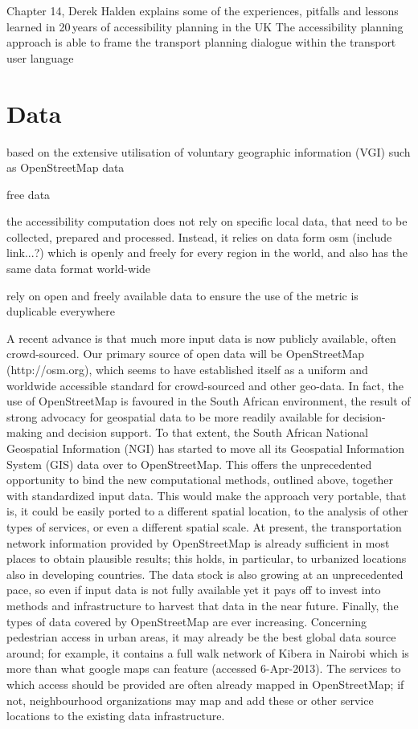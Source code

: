 Chapter 14, Derek Halden explains some of the experiences, pitfalls and lessons learned in 20\,years of accessibility 
planning in the UK The accessibility planning approach is able to frame the transport planning dialogue within 
the transport user language 


\section{Data}
based on the extensive utilisation of voluntary
geographic information (VGI) such as OpenStreetMap data

free data

the accessibility computation does not rely on specific local data, that need to be collected, prepared and processed. 
Instead, it relies on data form \gls{osm} (include link...?) which is openly and freely for every region in the world, 
and also has the same data format world-wide

rely on open and freely available data to ensure the use of the metric is duplicable everywhere

A recent advance is that much more input data is now publicly available, often crowd-sourced. Our primary source of open data will be OpenStreetMap (http://osm.org), which seems to have established itself as a uniform and worldwide accessible standard for crowd-sourced and other geo-data. In fact, the use of OpenStreetMap is favoured in the South African environment, the result of strong advocacy for geospatial data to be more readily available for decision-making and decision support. To that extent, the South African National Geospatial Information (NGI) has started to move all its Geospatial Information System (GIS) data over to OpenStreetMap.
This offers the unprecedented opportunity to bind the new computational methods, outlined above, together with standardized input data. This would make the approach very portable, that is, it could be easily ported to a different spatial location, to the analysis of other types of services, or even a different spatial scale.
At present, the transportation network information provided by OpenStreetMap is already sufficient in most places to obtain plausible results; this holds, in particular, to urbanized locations also in developing countries. The data stock is also growing at an unprecedented pace, so even if input data is not fully available yet it pays off to invest into methods and infrastructure to harvest that data in the near future. Finally, the types of data covered by OpenStreetMap are ever increasing. Concerning pedestrian access in urban areas, it may already be the best global data source around; for example, it contains a full walk network of Kibera in Nairobi which is more than what google maps can feature (accessed 6-Apr-2013). The services to which access should be provided are often already mapped in OpenStreetMap; if not, neighbourhood organizations may map and add these or other service locations to the existing data infrastructure.

